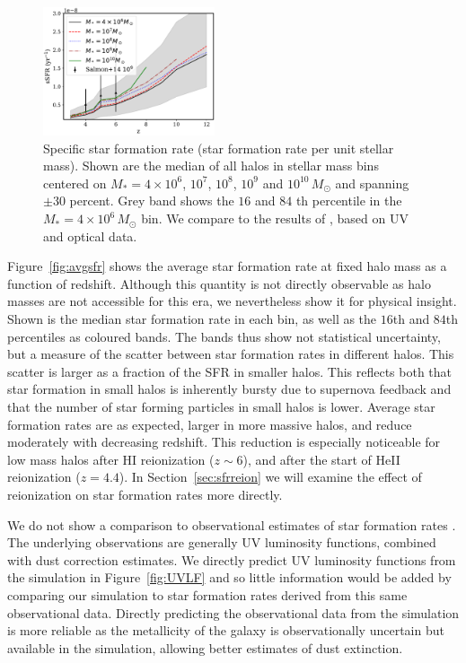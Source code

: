 \documentclass[fleqn,usenatbib]{mnras}
\def\msun{\, M_{\odot}}
\begin{document}
\begin{figure}
\centering
    \includegraphics[width=0.45\textwidth]{plots/ssfr.pdf}
  \caption{Specific star formation rate (star formation rate per unit stellar mass). Shown are the median of all halos in stellar mass bins centered on $M_* = 4\times 10^{6}$, $10^{7}$, $10^{8}$, $10^9$ and $10^{10} \msun$ and spanning $\pm 30$ percent. Grey band shows the $16$ and $84$ th percentile in the $M_* = 4\times 10^6 \msun$ bin. We compare to the results of \protect\cite{2015ApJ...799..183S}, based on UV and optical data.}  
  \label{fig:ssfr}
\end{figure}

Figure~\ref{fig:avgsfr} shows the average star formation rate at fixed halo mass as a function of redshift. Although this quantity is not directly observable as halo masses are not accessible for this era, we nevertheless show it for physical insight. Shown is the median star formation rate in each bin, as well as the $16$th and $84$th percentiles as coloured bands. The bands thus show not statistical uncertainty, but a measure of the scatter between star formation rates in different halos. This scatter is larger as a fraction of the SFR in smaller halos. This reflects both that star formation in small halos is inherently bursty due to supernova feedback and that the number of star forming particles in small halos is lower. Average star formation rates are as expected, larger in more massive halos, and reduce moderately with decreasing redshift. This reduction is especially noticeable for low mass halos after HI reionization ($z \sim 6$), and after the start of HeII reionization ($z=4.4$). In Section~\ref{sec:sfrreion} we will examine the effect of reionization on star formation rates more directly. 

We do not show a comparison to observational estimates of star formation rates \citep[see][for a review]{2013ApJ...770...57B}. The underlying observations are generally UV luminosity functions, combined with dust correction estimates. We directly predict UV luminosity functions from the simulation in Figure~\ref{fig:UVLF} and so little information would be added by comparing our simulation to star formation rates derived from this same observational data. Directly predicting the observational data from the simulation is more reliable as the metallicity of the galaxy is observationally uncertain but available in the simulation, allowing better estimates of dust extinction. 
\end{document}
